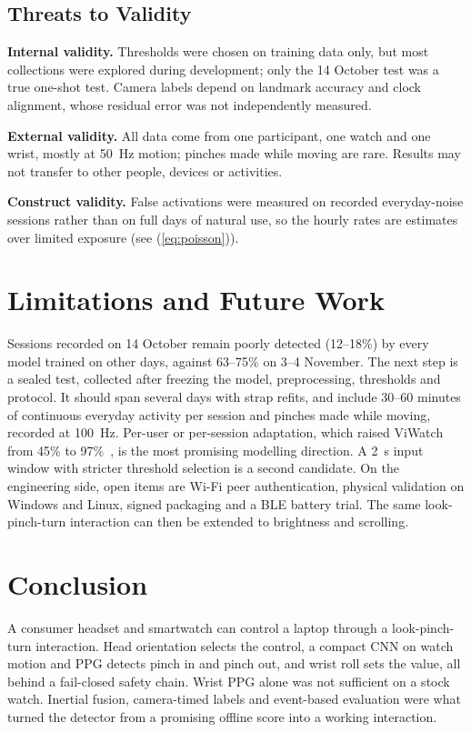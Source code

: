 \subsection{Threats to Validity}

\textbf{Internal validity.} Thresholds were chosen on training data only, but most collections were explored during development; only the 14 October test was a true one-shot test. Camera labels depend on landmark accuracy and clock alignment, whose residual error was not independently measured.

\textbf{External validity.} All data come from one participant, one watch and one wrist, mostly at 50~Hz motion; pinches made while moving are rare. Results may not transfer to other people, devices or activities.

\textbf{Construct validity.} False activations were measured on recorded everyday-noise sessions rather than on full days of natural use, so the hourly rates are estimates over limited exposure (see (\ref{eq:poisson})).

\section{Limitations and Future Work}\label{sec:future}

Sessions recorded on 14 October remain poorly detected (12--18\%) by every model trained on other days, against 63--75\% on 3--4 November. The next step is a sealed test, collected after freezing the model, preprocessing, thresholds and protocol. It should span several days with strap refits, and include 30--60 minutes of continuous everyday activity per session and pinches made while moving, recorded at 100~Hz. Per-user or per-session adaptation, which raised ViWatch from 45\% to 97\%~\cite{viwatch2023}, is the most promising modelling direction. A 2~s input window with stricter threshold selection is a second candidate. On the engineering side, open items are Wi-Fi peer authentication, physical validation on Windows and Linux, signed packaging and a BLE battery trial. The same look-pinch-turn interaction can then be extended to brightness and scrolling.

\section{Conclusion}\label{sec:conclusion}

A consumer headset and smartwatch can control a laptop through a look-pinch-turn interaction. Head orientation selects the control, a compact CNN on watch motion and PPG detects pinch in and pinch out, and wrist roll sets the value, all behind a fail-closed safety chain. Wrist PPG alone was not sufficient on a stock watch. Inertial fusion, camera-timed labels and event-based evaluation were what turned the detector from a promising offline score into a working interaction.
